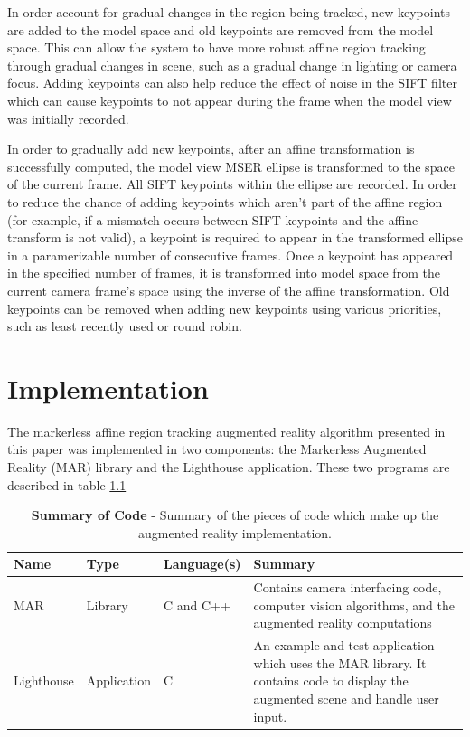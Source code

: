 \documentclass[oneside,11pt]{Latex/Classes/PhDthesisPSnPDF}
\begin{document}
In order account for gradual changes in the region being tracked, new keypoints are added to the model space and old keypoints are removed from the model space.  This can allow the system to have more robust affine region tracking through gradual changes in scene, such as a gradual change in lighting or camera focus.  Adding keypoints can also help reduce the effect of noise in the SIFT filter which can cause keypoints to not appear during the frame when the model view was initially recorded.

In order to gradually add new keypoints, after an affine transformation is successfully computed, the model view MSER ellipse is transformed to the space of the current frame.  All SIFT keypoints within the ellipse are recorded.  In order to reduce the chance of adding keypoints which aren't part of the affine region (for example, if a mismatch occurs between SIFT keypoints and the affine transform is not valid), a keypoint is required to appear in the transformed ellipse in a paramerizable number of consecutive frames.  Once a keypoint has appeared in the specified number of frames, it is transformed into model space from the current camera frame's space using the inverse of the affine transformation.  Old keypoints can be removed when adding new keypoints using various priorities, such as least recently used or round robin.

\chapter{Implementation}

The markerless affine region tracking augmented reality algorithm presented in this paper was implemented in two components: the Markerless Augmented Reality (MAR) library and the Lighthouse application.  These two programs are described in table \ref{table_code_summary}

\begin{table}[h]
\centering
\begin{tabular}{| l | l | l | p{6.5cm} |} 
\hline
{\bf Name} & {\bf Type} & {\bf Language(s)} & {\bf Summary} \\ \hline
MAR & Library & C and C++ & Contains camera interfacing code, computer vision 
algorithms, and the augmented reality computations \\ \hline
Lighthouse & Application & C & An example and test application which uses the MAR library.  It contains code to display the augmented scene and handle user input. \\ \hline
\end{tabular}
\caption[Summary of Code]{\textbf{Summary of Code} - Summary of the pieces of code which make up the augmented reality implementation.}
\label{table_code_summary}
\end{table}
\end{document}
